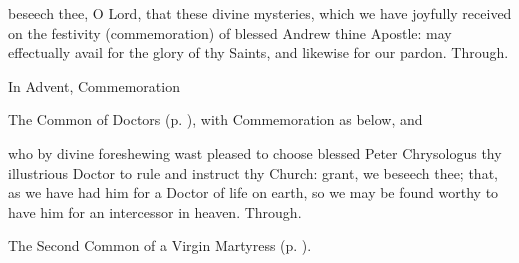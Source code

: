 \postcommunion
{} beseech thee, O Lord, that these divine mysteries, which we have joyfully received on the festivity (commemoration) of blessed Andrew thine Apostle: may effectually avail for the glory of thy Saints, and likewise for our pardon. Through.
\begin{rubric}
    In Advent, Commemoration 
\end{rubric}


\clearpage
{}

\begin{rubric}
	The Common of Doctors (p. \pageref{CommonDoctors}), with Commemoration  as below, and 
\end{rubric}

\vspace{-0.5\baselineskip}

\collect

\vspace{-0.2\baselineskip}

 who by divine foreshewing wast pleased to choose blessed Peter Chrysologus thy illustrious Doctor to rule and instruct thy Church: grant, we beseech thee; that, as we have had him for a Doctor of life on earth, so we may be found worthy to have him for an intercessor in heaven. Through.




\begin{rubric}
	The Second Common of a Virgin Martyress (p. \pageref{CommonVirginMartyrII}).
\end{rubric}

\vspace{-0.35\baselineskip}

